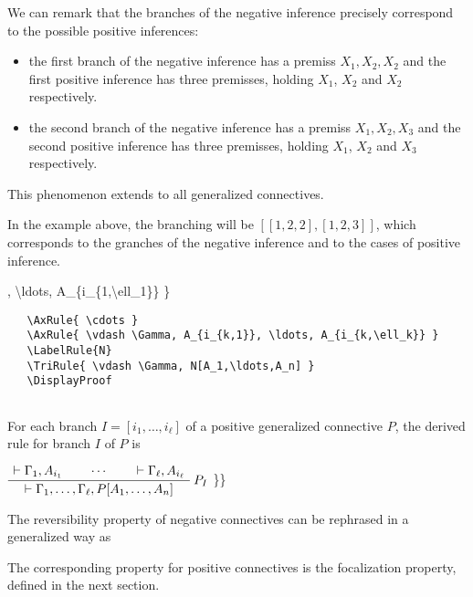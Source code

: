 We can remark that the branches of the negative inference precisely
correspond to the possible positive inferences:

\begin{itemize}
\tightlist
\item
  the first branch of the negative inference has a premiss
  \(X_1,X_2,X_2\) and the first positive inference has three premisses,
  holding \(X_1\), \(X_2\) and \(X_2\) respectively.
\item
  the second branch of the negative inference has a premiss
  \(X_1,X_2,X_3\) and the second positive inference has three premisses,
  holding \(X_1\), \(X_2\) and \(X_3\) respectively.
\end{itemize}

This phenomenon extends to all generalized connectives.

In the example above, the branching will be \([[1,2,2],[1,2,3]]\), which
corresponds to the granches of the negative inference and to the cases
of positive inference.

, \textbackslash{}ldots, A\_\{i\_\{1,\textbackslash{}ell\_1\}\} \}

\texttt{~~~\textbackslash{}AxRule\{~\textbackslash{}cdots~\}}\\
\texttt{~~~\textbackslash{}AxRule\{~\textbackslash{}vdash~\textbackslash{}Gamma,~A\_\{i\_\{k,1\}\},~\textbackslash{}ldots,~A\_\{i\_\{k,\textbackslash{}ell\_k\}\}~\}}\\
\texttt{~~~\textbackslash{}LabelRule\{N\}}\\
\texttt{~~~\textbackslash{}TriRule\{~\textbackslash{}vdash~\textbackslash{}Gamma,~N{[}A\_1,\textbackslash{}ldots,A\_n{]}~\}}\\
\texttt{~~~\textbackslash{}DisplayProof}\\
\texttt{~}

For each branch \(I=[i_1,\ldots,i_\ell]\) of a positive generalized
connective \(P\), the derived rule for branch \(I\) of \(P\) is

\(\AxRule{ \vdash \Gamma_1, A_{i_1} }
    \AxRule{ \cdots }
    \AxRule{ \vdash \Gamma_\ell, A_{i_\ell} }
    \LabelRule{P_I}
    \TriRule{ \vdash \Gamma_1, \ldots, \Gamma_\ell, P[A_1,\ldots,A_n] }
    \DisplayProof\) \}\}

The reversibility property of negative connectives can be rephrased in a
generalized way as

The corresponding property for positive connectives is the focalization
property, defined in the next section.

